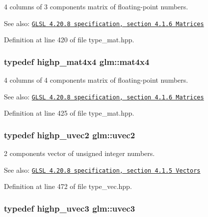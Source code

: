 4 columns of 3 components matrix of floating-point numbers.

\begin{Desc}
\item[See also:]\href{http://www.opengl.org/registry/doc/GLSLangSpec.4.20.8.pdf}{\tt GLSL 4.20.8 specification, section 4.1.6 Matrices} \end{Desc}


Definition at line 420 of file type\_\-mat.hpp.\hypertarget{group__core__types_g63e3ee9447ed593484140a9368e738ec}{
\subsubsection[mat4x4]{\setlength{\rightskip}{0pt plus 5cm}typedef highp\_\-mat4x4 {\bf glm::mat4x4}}}
\label{group__core__types_g63e3ee9447ed593484140a9368e738ec}


4 columns of 4 components matrix of floating-point numbers.

\begin{Desc}
\item[See also:]\href{http://www.opengl.org/registry/doc/GLSLangSpec.4.20.8.pdf}{\tt GLSL 4.20.8 specification, section 4.1.6 Matrices} \end{Desc}


Definition at line 425 of file type\_\-mat.hpp.\hypertarget{group__core__types_gfd2041b45eff671aa8899d2c2835eee9}{
\subsubsection[uvec2]{\setlength{\rightskip}{0pt plus 5cm}typedef highp\_\-uvec2 {\bf glm::uvec2}}}
\label{group__core__types_gfd2041b45eff671aa8899d2c2835eee9}


2 components vector of unsigned integer numbers.

\begin{Desc}
\item[See also:]\href{http://www.opengl.org/registry/doc/GLSLangSpec.4.20.8.pdf}{\tt GLSL 4.20.8 specification, section 4.1.5 Vectors} \end{Desc}


Definition at line 472 of file type\_\-vec.hpp.\hypertarget{group__core__types_gc4ba593917841b859ba1683b8b52b8fa}{
\subsubsection[uvec3]{\setlength{\rightskip}{0pt plus 5cm}typedef highp\_\-uvec3 {\bf glm::uvec3}}}
\label{group__core__types_gc4ba593917841b859ba1683b8b52b8fa}


